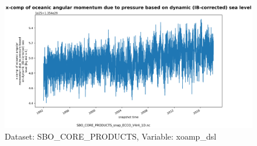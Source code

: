\begin{figure}[H]
\centering
\includegraphics[scale=0.55]{../images/plots/oneD_plots/SBO_Core_Products/xoamp_dsl.png}
\caption{Dataset: SBO\_CORE\_PRODUCTS, Variable: xoamp\_dsl}
\label{tab:table-SBO_CORE_PRODUCTS_xoamp_dsl-Plot}
\end{figure}
\newpage
\pagebreak
